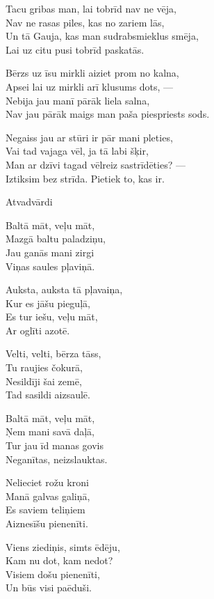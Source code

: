 \documentclass[14pt]{extarticle}
\begin{document}
Tacu gribas man, lai tobrīd nav ne vēja,\\
Nav ne rasas piles, kas no zariem lās,\\
Un tā Gauja, kas man sudrabsmieklus smēja,\\
Lai uz citu pusi tobrīd paskatās.

Bērzs uz īsu mirkli aiziet prom no kalna,\\
Apsei lai uz mirkli arī klusums dots, ---\\
Nebija jau manī pārāk liela salna,\\
Nav jau pārāk maigs man paša piespriests sods.

Negaiss jau ar stūri ir pār mani pleties,\\
Vai tad vajaga vēl, ja tā labi šķir,\\
Man ar dzīvi tagad vēlreiz sastrīdēties? ---\\
Iztiksim bez strīda. Pietiek to, kas ir.


\newpage

{\large \sc Atvadvārdi}

Baltā māt, veļu māt,\\
Mazgā baltu paladziņu,\\
Jau ganās mani zirgi\\
Viņas saules pļaviņā.

Auksta, auksta tā pļavaiņa,\\
Kur es jāšu pieguļā,\\
Es tur iešu, veļu māt,\\
Ar oglīti azotē.

Velti, velti, bērza tāss,\\
Tu raujies čokurā,\\
Nesildīji šai zemē,\\
Tad sasildi aizsaulē.

Baltā māt, veļu māt,\\
Ņem mani savā daļā,\\
Tur jau īd manas govis\\
Neganītas, neizslauktas.

Nelieciet rožu kroni\\
Manā galvas galiņā,\\
Es saviem teliņiem\\
Aiznesīšu pienenīti.

Viens ziediņis, simts ēdēju,\\
Kam nu dot, kam nedot?\\
Visiem došu pienenīti,\\
Un būs visi paēduši.
\end{document}
